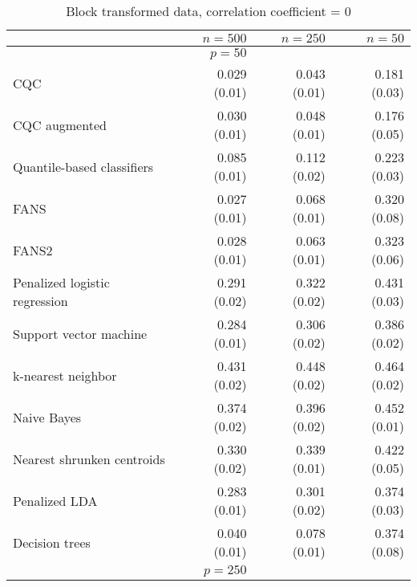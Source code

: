 \begin{table}[p]
  \centering
  \caption{Block transformed data, correlation coefficient = 0}
  \label{tab:block-transformed-corr0}
  \vspace{5mm}
  
  \begin{adjustbox}{max size={\textwidth}{10cm}}
    \begin{tabular}{l@{\extracolsep{15mm}}rrr}
      
      \hline
      & $n=500$ & $n=250$ & $n=50$ \\ 
      \hline
      & $p = 50$ \\
      \hline

      CQC & 0.029 (0.01) & 0.043 (0.01) & 0.181 (0.03) \\ 
      CQC augmented & 0.030 (0.01) & 0.048 (0.01) & 0.176 (0.05) \\ 
      Quantile-based classifiers & 0.085 (0.01) & 0.112 (0.02) & 0.223 (0.03) \\ 
      FANS  & 0.027 (0.01) & 0.068 (0.01) & 0.320 (0.08) \\
      FANS2 & 0.028 (0.01) & 0.063 (0.01) & 0.323 (0.06) \\
      Penalized logistic regression & 0.291 (0.02) & 0.322 (0.02) & 0.431 (0.03) \\ 
      Support vector machine & 0.284 (0.01) & 0.306 (0.02) & 0.386 (0.02) \\ 
      k-nearest neighbor & 0.431 (0.02) & 0.448 (0.02) & 0.464 (0.02) \\ 
      Naive Bayes & 0.374 (0.02) & 0.396 (0.02) & 0.452 (0.01) \\ 
      Nearest shrunken centroids & 0.330 (0.02) & 0.339 (0.01) & 0.422 (0.05) \\ 
      Penalized LDA & 0.283 (0.01) & 0.301 (0.02) & 0.374 (0.03) \\ 
      Decision trees & 0.040 (0.01) & 0.078 (0.01) & 0.374 (0.08) \\ [2ex]

      \hline
      & $p = 250$ \\
      \hline


\end{tabular}
\end{adjustbox}
\end{table}
